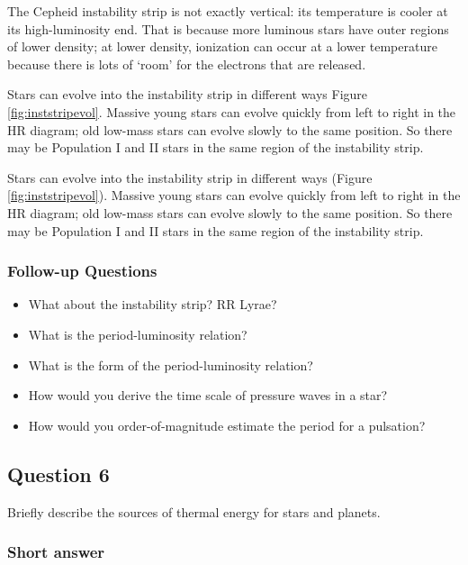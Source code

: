 \documentclass[a4paper,10pt]{article}
\begin{document}
{\noindent}The Cepheid instability strip is not exactly vertical: its temperature is cooler at its high-luminosity end. That is because more luminous stars have outer regions of lower density; at lower density, ionization can occur at a lower temperature because there is lots of `room' for the electrons that are released.

{\noindent}Stars can evolve into the instability strip in different ways Figure \ref{fig:inststripevol}. Massive young stars can evolve quickly from left to right in the HR diagram; old low-mass stars can evolve slowly to the same position. So there may be Population I and II stars in the same region of the instability strip.

{\noindent}Stars can evolve into the instability strip in different ways (Figure \ref{fig:inststripevol}). Massive young stars can evolve quickly from left to right in the HR diagram; old low-mass stars can evolve slowly to the same position. So there may be Population I and II stars in the same region of the instability strip.

\subsubsection{Follow-up Questions}

\begin{itemize}
    \item What about the instability strip? RR Lyrae?
    \item What is the period-luminosity relation?
    \item What is the form of the period-luminosity relation?
    \item How would you derive the time scale of pressure waves in a star?
    \item How would you order-of-magnitude estimate the period for a pulsation?
\end{itemize}


\newpage
\subsection{Question 6}

Briefly describe the sources of thermal energy for stars and planets.

\subsubsection{Short answer}
\end{document}
